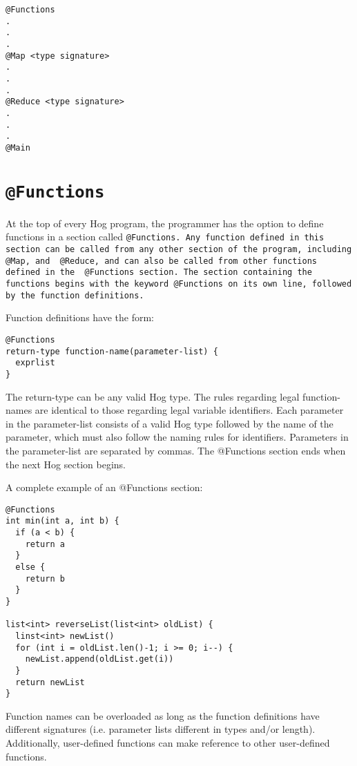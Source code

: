 \documentclass{book}
\begin{document}
\begin{verbatim}
@Functions 
.
.
.
@Map <type signature>
.
.
.
@Reduce <type signature>
.
.
.
@Main
\end{verbatim}


\section{\tt @Functions\rm} %
\label{sec:tt_functionsrm}

At the top of every Hog program, the programmer has the option to define functions
in a section called \tt @Functions\rm. Any function defined in this section can be
called from any other section of the program, including \tt @Map\rm, and \tt
@Reduce\rm, and can also be called from other functions defined in the \tt
@Functions \rm section. The section containing the functions begins with the
keyword \tt @Functions \rm on its own line, followed by the function definitions.

Function definitions have the form:

\begin{verbatim}
@Functions
return-type function-name(parameter-list) {
  exprlist
}
\end{verbatim}

The return-type can be any valid Hog type. The rules regarding legal function-names
are identical to those regarding legal variable identifiers. Each parameter in the
parameter-list consists of a valid Hog type followed by the name of the parameter,
which must also follow the naming rules for identifiers. Parameters in the
parameter-list are separated by commas. The @Functions section ends when the next
Hog section begins.

A complete example of an @Functions section:

\begin{verbatim}
@Functions
int min(int a, int b) {
  if (a < b) {
    return a
  }
  else {
    return b
  }
}

list<int> reverseList(list<int> oldList) {
  linst<int> newList()
  for (int i = oldList.len()-1; i >= 0; i--) {
    newList.append(oldList.get(i))
  }
  return newList
}
\end{verbatim}

Function names can be overloaded as long as the function definitions have different
signatures (i.e. parameter lists different in types and/or length). Additionally,
user-defined functions can make reference to other user-defined functions.
\end{document}

